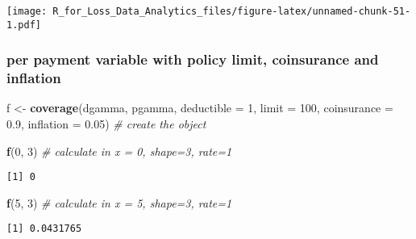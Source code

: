 \documentclass[]{book}
\newenvironment{Shaded}{\begin{snugshade}}{\end{snugshade}}
\newcommand{\KeywordTok}[1]{\textcolor[rgb]{0.13,0.29,0.53}{\textbf{#1}}}
\newcommand{\DataTypeTok}[1]{\textcolor[rgb]{0.13,0.29,0.53}{#1}}
\newcommand{\DecValTok}[1]{\textcolor[rgb]{0.00,0.00,0.81}{#1}}
\newcommand{\FloatTok}[1]{\textcolor[rgb]{0.00,0.00,0.81}{#1}}
\newcommand{\StringTok}[1]{\textcolor[rgb]{0.31,0.60,0.02}{#1}}
\newcommand{\CommentTok}[1]{\textcolor[rgb]{0.56,0.35,0.01}{\textit{#1}}}
\newcommand{\NormalTok}[1]{#1}
\theoremstyle{definition}
\theoremstyle{definition}
\theoremstyle{definition}
\theoremstyle{remark}
\begin{document}
\texttt{[image: R\_for\_Loss\_Data\_Analytics\_files/figure-latex/unnamed-chunk-51-1.pdf]}

\subsubsection{per payment variable with policy limit, coinsurance and
inflation}\label{per-payment-variable-with-policy-limit-coinsurance-and-inflation}

\begin{Shaded}
\begin{Highlighting}[]
\NormalTok{f <-}\StringTok{ }\KeywordTok{coverage}\NormalTok{(dgamma, pgamma, }\DataTypeTok{deductible =} \DecValTok{1}\NormalTok{, }\DataTypeTok{limit =} \DecValTok{100}\NormalTok{, }\DataTypeTok{coinsurance =} \FloatTok{0.9}\NormalTok{, }\DataTypeTok{inflation =} \FloatTok{0.05}\NormalTok{) }\CommentTok{# create the object}

\KeywordTok{f}\NormalTok{(}\DecValTok{0}\NormalTok{, }\DecValTok{3}\NormalTok{) }\CommentTok{# calculate in x = 0, shape=3, rate=1}
\end{Highlighting}
\end{Shaded}

\begin{verbatim}
[1] 0
\end{verbatim}

\begin{Shaded}
\begin{Highlighting}[]
\KeywordTok{f}\NormalTok{(}\DecValTok{5}\NormalTok{, }\DecValTok{3}\NormalTok{) }\CommentTok{# calculate in x = 5, shape=3, rate=1}
\end{Highlighting}
\end{Shaded}

\begin{verbatim}
[1] 0.0431765
\end{verbatim}
\end{document}
